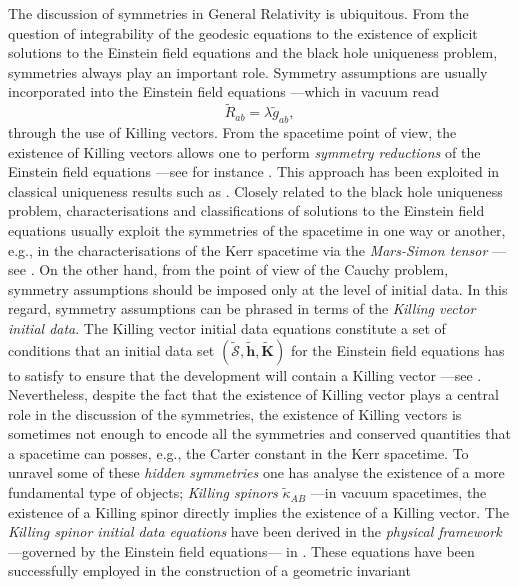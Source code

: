 \documentclass[10pt,a4paper]{article}
\theoremstyle{plain}
\def\bmh{{\bm h}}
\def\bmK{{\bm K}}
\begin{document}
The discussion of symmetries  in General
Relativity is ubiquitous. From the question of integrability of the geodesic
equations to the existence of explicit solutions to the Einstein field
equations and the black hole uniqueness problem, symmetries always
  play an important role.   Symmetry assumptions are usually incorporated into
 the Einstein field equations ---which in vacuum read
\begin{equation}
\tilde{R}_{ab}=\lambda \tilde{g}_{ab},
\label{EFEVacuum}
\end{equation} 
 through the use of Killing vectors.  From the spacetime point
 of view, the existence of Killing vectors allows one to perform
 \emph{symmetry reductions} of the Einstein field equations ---see for
 instance \cite{Wei90a}. This approach has been exploited in classical
 uniqueness results such as \cite{Rob75b}.  Closely related to the black
 hole uniqueness problem, characterisations and classifications of
  solutions to the Einstein field equations usually exploit the
 symmetries of the spacetime in one way or another, e.g., in the
 characterisations of the Kerr spacetime via the \emph{Mars-Simon
   tensor} ---see \cite{Mar99,Mar00,Sim84}.  On the other hand, from
 the point of view of the Cauchy problem, symmetry assumptions should
 be imposed only at the level of initial data. In this regard,
 symmetry assumptions can be phrased in terms of the \emph{Killing
   vector initial data}.  The Killing vector initial data equations
 constitute a set of conditions that an initial data set
 $(\tilde{\mathcal{S}},\tilde{\bmh},\tilde{\bmK})$ for the Einstein
 field equations has to satisfy to ensure that the development will
 contain a Killing vector ---see \cite{BeiChr97b}.  Nevertheless,
 despite the fact that the existence of Killing vector plays a
central  role in the discussion of the symmetries, the
 existence of Killing vectors is sometimes not enough to encode all
 the symmetries and conserved quantities that a spacetime can posses,
 e.g., the Carter constant in the Kerr spacetime. To unravel some of
 these \emph{hidden symmetries} one has analyse the existence of a
 more fundamental type of objects; \emph{Killing spinors}
 $\tilde{\kappa}_{AB}$ ---in vacuum spacetimes, the existence of a
 Killing spinor directly implies the existence of a Killing
 vector. The \emph{Killing spinor initial data equations} have been
 derived in the \emph{physical framework} ---governed by the Einstein field
   equations--- in \cite{GarVal08c}.  These equations have been
 successfully employed in the construction of a geometric invariant
\end{document}
